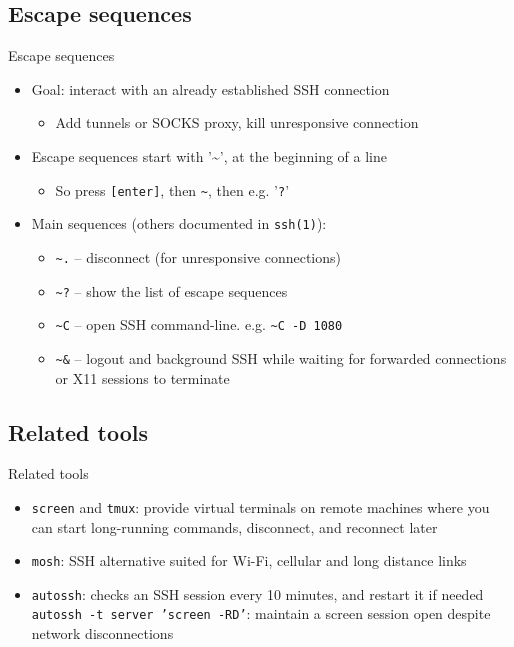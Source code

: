 \documentclass[11pt,final,usepdftitle=false]{beamer}
\newcommand{\tilda}{\textasciitilde{}}
\begin{document}
\subsection{Escape sequences}
\begin{frame}[fragile]{Escape sequences}
\begin{itemize}
\item Goal: interact with an already established SSH connection
	\begin{itemize}
		\item Add tunnels or SOCKS proxy, kill unresponsive connection
	\end{itemize}
\hbr
\item Escape sequences start with '\tilda', at the beginning of a line
	\begin{itemize}
		\item So press \texttt{[enter]}, then \texttt{\tilda}, then e.g. '\texttt{?}'
	\end{itemize}
\hbr
\item Main sequences (others documented in \texttt{ssh(1)}):
	\begin{itemize}
		\item \texttt{\tilda{}.} -- disconnect (for unresponsive connections)
		\item \texttt{\tilda{}?} -- show the list of escape sequences
		\item \texttt{\tilda{}C} -- open SSH command-line. e.g. \texttt{\tilda{}C -D 1080}
		\item \texttt{\tilda{}\&} -- logout and background SSH while waiting for forwarded connections or X11 sessions to terminate
	\end{itemize}
\end{itemize}
\end{frame}

\subsection{Related tools}
\begin{frame}{Related tools}
\begin{itemize}
\item \texttt{screen} and \texttt{tmux}: provide virtual terminals on remote
	machines where you can start long-running commands, disconnect, and
	reconnect later
	\hbr
\item \texttt{mosh}: SSH alternative suited for Wi-Fi, cellular and long distance links
	\hbr
\item \texttt{autossh}: checks an SSH session every 10 minutes, and restart it if needed\\
	\texttt{autossh -t server 'screen -RD'}: maintain a screen session open despite network disconnections
\end{itemize}
\end{frame}
\end{document}
